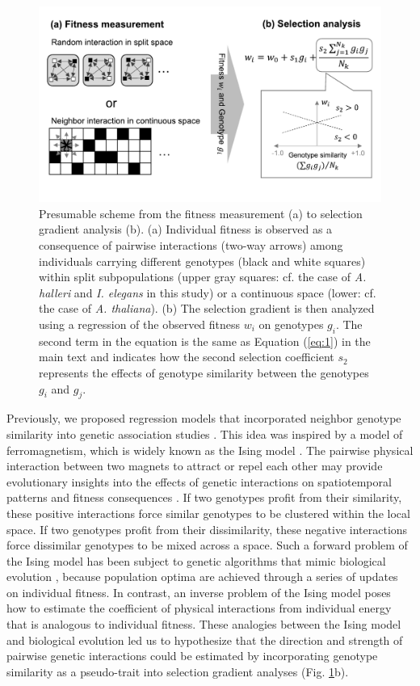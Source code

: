 \documentclass[12pt,]{article}
\begin{document}
\begin{figure}[ht]
  \includegraphics[width=0.8\linewidth]{scheme.pdf}
  \caption{Presumable scheme from the fitness measurement (a) to selection gradient analysis (b). (a) Individual fitness is observed as a consequence of pairwise interactions (two-way arrows) among individuals carrying different genotypes (black and white squares) within split subpopulations (upper gray squares: cf. the case of \textit{A. halleri} and \textit{I. elegans} in this study) or a continuous space (lower: cf. the case of \textit{A. thaliana}). (b) The selection gradient is then analyzed using a regression of the observed fitness $w_i$ on genotypes $g_i$. The second term in the equation is the same as Equation (\ref{eq:1}) in the main text and indicates how the second selection coefficient $s_2$ represents the effects of genotype similarity between the genotypes $g_i$ and $g_j$.
}
  \label{fig1:scheme}
\end{figure}

Previously, we proposed regression models that incorporated neighbor genotype similarity into genetic association studies \citep{sato2019neighbor, sato2020neighbor}. This idea was inspired by a model of ferromagnetism, which is widely known as the Ising model \citep{cipra1987introduction}. The pairwise physical interaction between two magnets to attract or repel each other may provide evolutionary insights into the effects of genetic interactions on spatiotemporal patterns and fitness consequences \citep{sato2019neighbor}. If two genotypes profit from their similarity, these positive interactions force similar genotypes to be clustered within the local space. If two genotypes profit from their dissimilarity, these negative interactions force dissimilar genotypes to be mixed across a space. Such a forward problem of the Ising model has been subject to genetic algorithms that mimic biological evolution \citep{anderson1991two, prugel1997dynamics}, because population optima are achieved through a series of updates on individual fitness. In contrast, an inverse problem of the Ising model poses how to estimate the coefficient of physical interactions from individual energy that is analogous to individual fitness. These analogies between the Ising model and biological evolution led us to hypothesize that the direction and strength of pairwise genetic interactions could be estimated by incorporating genotype similarity as a pseudo-trait into selection gradient analyses (Fig. \ref{fig1:scheme}b).
\end{document}
